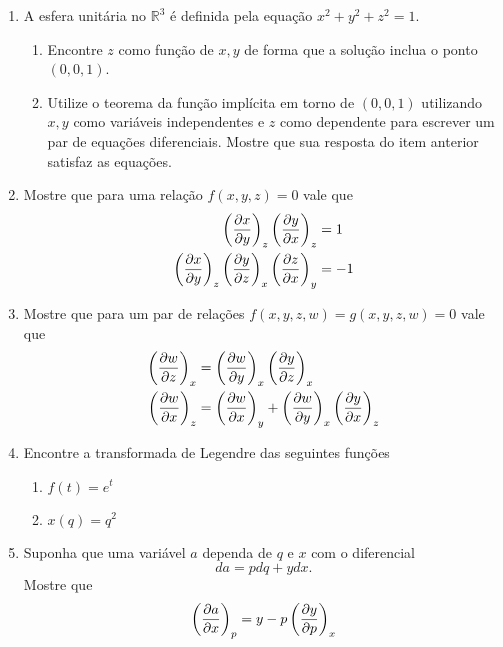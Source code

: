 \begin{enumerate}
    \item
        A esfera unitária no $\mathbb R^3$ é definida pela equação $x^2+y^2+z^2
        =1$.
        \begin{enumerate}
            \item
                Encontre $z$ como função de $x,y$ de forma que a solução inclua
                o ponto $(0,0,1)$.
            \item
                Utilize o teorema da função implícita em torno de $(0,0,1)$
                utilizando $x,y$ como variáveis independentes e $z$ como
                dependente para escrever um par de equações diferenciais. Mostre
                que sua resposta do item anterior satisfaz as equações.
        \end{enumerate}

    \item
        Mostre que para uma relação $f(x,y,z)=0$ vale que
        \begin{align*}
            \pd{x}{y}{z}\pd{y}{x}{z}&=1\\
            \pd{x}{y}{z}\pd{y}{z}{x}\pd{z}{x}{y}&=-1
        \end{align*}

    \item
        Mostre que para um par de relações $f(x,y,z,w)=g(x,y,z,w)=0$ vale que
        \begin{align*}
            \pd{w}{z}{x}&=\pd{w}{y}{x}\pd{y}{z}{x}\\
            \pd{w}{x}{z}&=\pd{w}{x}{y}+\pd{w}{y}{x}\pd{y}{x}{z}
        \end{align*}

    \item
        Encontre a transformada de Legendre das seguintes funções
        \begin{enumerate}
            \item
                $f(t)=e^t$
            \item
                $x(q)=q^2$
        \end{enumerate}

    \item
        Suponha que uma variável $a$ dependa de $q$ e $x$ com o diferencial
        $$da=pdq+ydx.$$
        Mostre que
        $$\pd{a}{x}{p}=y-p\pd{y}{p}{x}$$


\end{enumerate}
